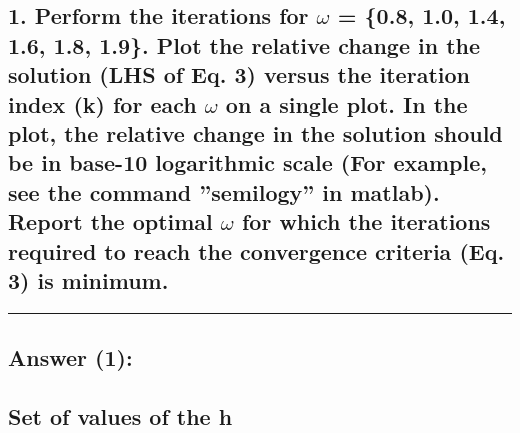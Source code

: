 \documentclass[11pt]{article}
\begin{document}
    \hypertarget{perform-the-iterations-for-omega-0.8-1.0-1.4-1.6-1.8-1.9.-plot-the-relative-change-in-the-solution-lhs-of-eq.-3-versus-the-iteration-index-k-for-each-omega-on-a-single-plot.-in-the-plot-the-relative-change-in-the-solution-should-be-in-base-10-logarithmic-scale-for-example-see-the-command-semilogy-in-matlab.-report-the-optimal-omega-for-which-the-iterations-required-to-reach-the-convergence-criteria-eq.-3-is-minimum.}{%
\subsection{\texorpdfstring{1. Perform the iterations for \(\omega\) =
\{0.8, 1.0, 1.4, 1.6, 1.8, 1.9\}. Plot the relative change in the
solution (LHS of Eq. 3) versus the iteration index (k) for each
\(\omega\) on a single plot. In the plot, the relative change in the
solution should be in base-10 logarithmic scale (For example, see the
command ''semilogy'' in matlab). Report the optimal \(\omega\) for which
the iterations required to reach the convergence criteria (Eq. 3) is
minimum.}{1. Perform the iterations for \textbackslash{}omega = \{0.8, 1.0, 1.4, 1.6, 1.8, 1.9\}. Plot the relative change in the solution (LHS of Eq. 3) versus the iteration index (k) for each \textbackslash{}omega on a single plot. In the plot, the relative change in the solution should be in base-10 logarithmic scale (For example, see the command ''semilogy'' in matlab). Report the optimal \textbackslash{}omega for which the iterations required to reach the convergence criteria (Eq. 3) is minimum.}}\label{perform-the-iterations-for-omega-0.8-1.0-1.4-1.6-1.8-1.9.-plot-the-relative-change-in-the-solution-lhs-of-eq.-3-versus-the-iteration-index-k-for-each-omega-on-a-single-plot.-in-the-plot-the-relative-change-in-the-solution-should-be-in-base-10-logarithmic-scale-for-example-see-the-command-semilogy-in-matlab.-report-the-optimal-omega-for-which-the-iterations-required-to-reach-the-convergence-criteria-eq.-3-is-minimum.}}

    \begin{center}\rule{0.5\linewidth}{0.5pt}\end{center}

    \hypertarget{answer-1}{%
\subsection{Answer (1):}\label{answer-1}}

    \hypertarget{set-of-values-of-the-h}{%
\subsection{Set of values of the h}\label{set-of-values-of-the-h}}
\end{document}
